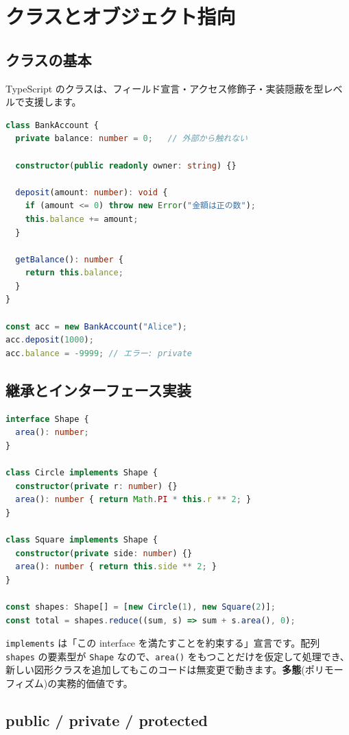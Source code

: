 \documentclass{article}
\begin{document}
\section{クラスとオブジェクト指向}

\subsection{クラスの基本}

TypeScript のクラスは、フィールド宣言・アクセス修飾子・実装隠蔽を型レベルで支援します。

\begin{lstlisting}[language=TypeScript]
class BankAccount {
  private balance: number = 0;   // 外部から触れない

  constructor(public readonly owner: string) {}

  deposit(amount: number): void {
    if (amount <= 0) throw new Error("金額は正の数");
    this.balance += amount;
  }

  getBalance(): number {
    return this.balance;
  }
}

const acc = new BankAccount("Alice");
acc.deposit(1000);
acc.balance = -9999; // エラー: private
\end{lstlisting}

\subsection{継承とインターフェース実装}

\begin{lstlisting}[language=TypeScript]
interface Shape {
  area(): number;
}

class Circle implements Shape {
  constructor(private r: number) {}
  area(): number { return Math.PI * this.r ** 2; }
}

class Square implements Shape {
  constructor(private side: number) {}
  area(): number { return this.side ** 2; }
}

const shapes: Shape[] = [new Circle(1), new Square(2)];
const total = shapes.reduce((sum, s) => sum + s.area(), 0);
\end{lstlisting}

\texttt{implements} は「この interface を満たすことを約束する」宣言です。配列 \texttt{shapes} の要素型が \texttt{Shape} なので、\texttt{area()} をもつことだけを仮定して処理でき、新しい図形クラスを追加してもこのコードは無変更で動きます。\textbf{多態}(ポリモーフィズム)の実務的価値です。

\subsection{public / private / protected}
\end{document}
